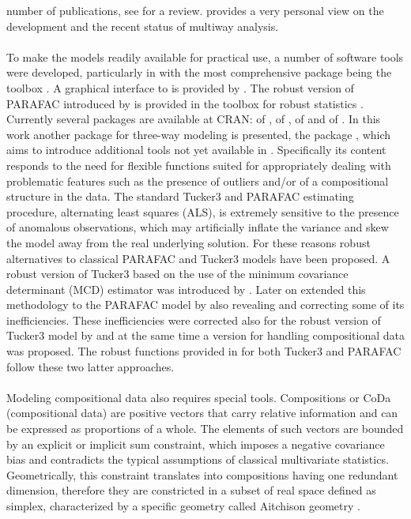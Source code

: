 \documentclass[article,shortnames, nojss]{jss}
\begin{document}
number of publications, see \citet{acar:2009} for a review.
\citet{kroonenberg:2016} provides a very personal view on
the development and the recent status of multiway analysis.\\\\
To make the models readily available for practical use, a number of
software tools were developed, particularly in 
with the most comprehensive package being
the  toolbox \citep{bro:2000}. A graphical interface to 
is provided by  \citep{cubatch:2005}. The robust version of PARAFAC
introduced by \citet{Engelen11} is provided in the  toolbox for
robust statistics  \citep{verboven-libra:2010}. Currently
several  packages are available at CRAN:
 of \citet{leibovici:2010},  of \citet{threeway:2014},
 of \citet{multiway:2016} and  of \citet{rTensor:2018}.
In this work another package for three-way modeling is presented, the package
, which aims to introduce additional tools not yet available
in . Specifically its content responds to the need for flexible
functions suited for appropriately dealing with problematic features such
as the presence of outliers and/or of a compositional structure in the data.
The standard Tucker3 and PARAFAC estimating procedure, alternating least
squares (ALS), is extremely sensitive to the presence of anomalous observations,
which may artificially inflate the variance and skew the model away
from the real underlying solution.
For these reasons robust alternatives to classical PARAFAC and
Tucker3 models have been proposed. A robust version of Tucker3
based on the use of the minimum covariance determinant (MCD)
estimator \citep{Rousseeuw99} was introduced by \citet{pravdova2001robust}.
Later on \citet{Engelen11} extended this methodology to the PARAFAC
model by also revealing and correcting some of its inefficiencies. These
inefficiencies were corrected also for the robust version of Tucker3 model
by \cite{todorov:tucker3} and at the same time a version for handling
compositional data was proposed.
The robust functions provided in  for both
Tucker3 and PARAFAC follow these two latter approaches.\\\\
Modeling compositional data also requires special tools. Compositions or CoDa (compositional data) are positive vectors that carry relative information and can be expressed as proportions of a whole. The elements of such vectors are bounded by an explicit or implicit sum constraint, which imposes a negative covariance bias and contradicts the typical assumptions of classical multivariate statistics. Geometrically, this constraint translates into compositions having one redundant dimension, therefore they are constricted in a subset of real space defined as simplex, characterized by a specific geometry called Aitchison geometry \citep{Ego05,Ego06,Ego03,egozcue2011elements}.
\end{document}
